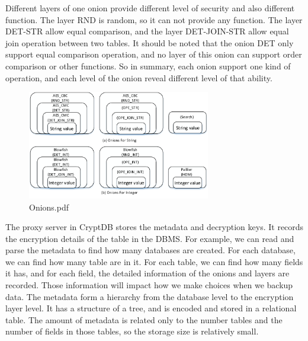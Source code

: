 Different layers of one onion provide different level of security and also different function. The layer RND is random, so it can not provide any function. The layer DET-STR allow equal comparison, and the layer DET-JOIN-STR allow equal join operation between two tables. It should be noted that the onion DET only support equal comparison operation, and no layer of this onion can support order comparison or other functions. So in summary, each onion support one kind of operation, and each level of the onion reveal different level of that ability.





\begin{figure}[tb]
\centering
\includegraphics[width=8cm]{images/Onions.pdf}
\caption{Onions.pdf}
\label{fig:stack2}
\end{figure}


The proxy server in CryptDB stores the metadata and decryption keys. It records the encryption details of the table in the DBMS. For example, we can read and parse the metadata to find how many databases are created. For each database, we can find how many table are in it. For each table, we can find how many fields it has, and for each field, the detailed information of the onions and layers are recorded. Those information will impact how we make choices when we backup data. The metadata form a hierarchy from the database level to the encryption layer level. It has a structure of a tree, and is encoded and stored in a relational table. The amount of metadata is related only to the number tables and the number of fields in those tables, so the storage size is relatively small.






